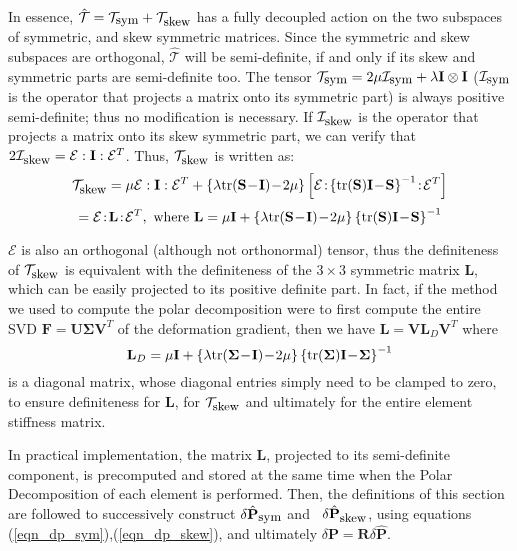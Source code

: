 In essence, $\hat{\mathcal{T}}=\mathcal{T}_{\mbox{\small sym}}+\mathcal{T}_{\mbox{\small skew}}$ has a fully decoupled action on the two subspaces of symmetric, and skew symmetric
matrices. Since the symmetric and skew subspaces are orthogonal, $\hat{\mathcal{T}}$ will be semi-definite, if and only if its skew and symmetric parts are semi-definite too. The
tensor $\mathcal{T}_{\mbox{\small sym}}=2\mu\mathcal{I}_{\mbox{\small sym}}+\lambda\mathbf{I}\otimes\mathbf{I}$ ($\mathcal{I}_{\mbox{\small sym}}$ is the operator that projects a
matrix onto its symmetric part) is always positive semi-definite; thus no modification is necessary. If $\mathcal{I}_{\mbox{\small skew}}$ is the operator that projects a matrix onto
its skew symmetric part, we can verify that $2\mathcal{I}_{\mbox{\small skew}}=\mathcal{E}:\mathbf{I}:\mathcal{E}^T$. Thus, $\mathcal{T}_{\mbox{\small skew}}$ is written as:
$$
\mathcal{T}_{\mbox{\small skew}}=\mu\mathcal{E}:\mathbf{I}:\mathcal{E}^T+\left\{\lambda\tr(\mathbf{S}\!-\!\mathbf{I})\!-\!2\mu\right\}\left[\mathcal{E}\!:\!\left\{\tr(\mathbf{S})\mathbf{I}\!-\!\mathbf{S}\right\}^{-1}\!:\!\mathcal{E}^T\right]
$$
$$
=\mathcal{E}\!:\!\mathbf{L}\!:\!\mathcal{E}^T,\ \mbox{where}\ \mathbf{L}=\mu\mathbf{I}+\left\{\lambda\tr(\mathbf{S}\!-\!\mathbf{I})\!-\!2\mu\right\}\left\{\tr(\mathbf{S})\mathbf{I}\!-\!\mathbf{S}\right\}^{-1}
$$

$\mathcal{E}$ is also an orthogonal (although not orthonormal) tensor, thus the definiteness of $\mathcal{T}_{\mbox{\small skew}}$ is equivalent with the definiteness of the $3\times 3$ 
symmetric matrix $\mathbf{L}$, which can be easily projected to its positive definite part. In fact, if the method we used to compute the polar decomposition were to first compute the
entire SVD $\mathbf{F}=\mathbf{U}\mathbf{\Sigma}\mathbf{V}^T$ of the deformation gradient, then we have $\mathbf{L}=\mathbf{V}\mathbf{L}_D\mathbf{V}^T$ where
$$
\mathbf{L}_D=\mu\mathbf{I}+\left\{\lambda\mbox{tr}(\mathbf{\Sigma}\!-\!\mathbf{I})\!-\!2\mu\right\}\left\{\mbox{tr}(\mathbf{\Sigma})\mathbf{I}\!-\!\mathbf{\Sigma}\right\}^{-1}
$$
is a diagonal matrix, whose diagonal entries simply need to be clamped to zero, to ensure definiteness for $\mathbf{L}$, for $\mathcal{T}_{\mbox{\small skew}}$ and ultimately for the entire
element stiffness matrix. 

In practical implementation, the matrix $\mathbf{L}$, projected to its semi-definite component, is precomputed and stored at the same time when the Polar Decomposition
of each element is performed. Then, the definitions of this section are followed to successively construct 
$\delta\hat{\mathbf{P}}_{\mbox{\small sym}}$ and \ $\delta\hat{\mathbf{P}}_{\mbox{\small skew}}$, using equations (\ref{eqn_dp_sym}),(\ref{eqn_dp_skew}), and ultimately
$\delta\mathbf{P}=\mathbf{R}\delta\hat{\mathbf{P}}$. 

